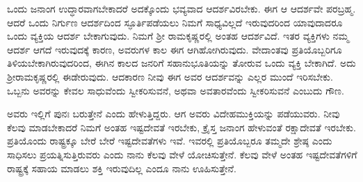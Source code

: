 ಒಂದು ಜನಾಂಗ ಉದ್ಧಾರವಾಗಬೇಕಾದರೆ ಅದಕ್ಕೊಂದು ಭವ್ಯವಾದ ಆದರ್ಶವಿರಬೇಕು. ಈಗ ಆ ಆದರ್ಶವೇ ಪರಬ್ರಹ್ಮ. ಆದರೆ ಒಂದು ನಿರ್ಗುಣ ಆದರ್ಶದಿಂದ ಸ್ಫೂರ್ತಿಪಡೆಯಲು ನಿಮಗೆ ಸಾಧ್ಯವಿಲ್ಲದೆ ಇರುವುದರಿಂದ ಯಾವುದಾದರೂ ಒಂದು ವ್ಯಕ್ತಿಯ ಆದರ್ಶ ಬೇಕಾಗುವುದು. ನಿಮಗೆ ಶ‍್ರೀ ರಾಮಕೃಷ್ಣರಲ್ಲಿ ಅಂತಹ ಆದರ್ಶವಿದೆ. ಇತರ ವ್ಯಕ್ತಿಗಳು ನಮ್ಮ ಆದರ್ಶ ಆಗದೆ ಇರುವುದಕ್ಕೆ ಕಾರಣ, ಅವರುಗಳ ಕಾಲ ಈಗ ಆಗಿಹೋಗಿರುವುದು. ವೇದಾಂತವು ಪ್ರತಿಯೊಬ್ಬರಿಗೂ ತಿಳಿಯಬೇಕಾಗಿರುವುದರಿಂದ, ಈಗಿನ ಕಾಲದ ಜನರಿಗೆ ಸಹಾನುಭೂತಿಯನ್ನು ತೋರುವ ಒಂದು ವ್ಯಕ್ತಿ ಬೇಕಾಗಿದೆ. ಅದು ಶ‍್ರೀರಾಮಕೃಷ್ಣರಲ್ಲಿ ಈಡೇರುವುದು. ಆದಕಾರಣ ನೀವು ಈಗ ಅವರ ಆದರ್ಶವನ್ನು ಎಲ್ಲರ ಮುಂದೆ ಇರಿಸಬೇಕು. ಒಬ್ಬನು ಅವರನ್ನು ಕೇವಲ ಸಾಧುವೆಂದು ಸ್ವೀಕರಿಸುವನೆ, ಅಥವಾ ಅವತಾರವೆಂದು ಸ್ವೀಕರಿಸುವನೆ ಎಂಬುದು ಗೌಣ.

ಅವರು ಇಲ್ಲಿಗೆ ಪುನಃ ಬರುತ್ತೇನೆ ಎಂದು ಹೇಳುತ್ತಿದ್ದರು. ಆಗ ಅವರು ವಿದೇಹ\break ಮುಕ್ತಿಯನ್ನು ಪಡೆಯುವರು. ನೀವು ಕೆಲವು ಮಾಡಬೇಕಾದರೆ ನಿಮಗೆ ಅಂತಹ ಇಷ್ಟದೇವತೆ ಇರಬೇಕು, ಕ್ರೈಸ್ತ ಜನಾಂಗ ಹೇಳುವಂತೆ ರಕ್ಷಾದೇವತೆ ಇರಬೇಕು. ಪ್ರತಿಯೊಂದು ರಾಷ್ಟ್ರಕ್ಕೂ ಬೇರೆ ಬೇರೆ ಇಷ್ಟದೇವತೆಗಳು ಇವೆ. ಇವರಲ್ಲಿ ಪ್ರತಿಯೊಬ್ಬರೂ ತಮ್ಮದೇ ಶ್ರೇಷ್ಠ ಎಂದು ಸಾಧಿಸಲು ಪ್ರಯತ್ನಿಸುತ್ತಿರುವರು ಎಂದು ನಾನು ಕೆಲವು ವೇಳೆ ಯೋಚಿಸುತ್ತೇನೆ. ಕೆಲವು ವೇಳೆ ಅಂತಹ ಇಷ್ಟದೇವತೆಗಳಿಗೆ ರಾಷ್ಟ್ರಕ್ಕೆ ಸಹಾಯ ಮಾಡಲು ಶಕ್ತಿ ಇರುವುದಿಲ್ಲ ಎಂದೂ ನಾನು ಊಹಿಸುತ್ತೇನೆ.

